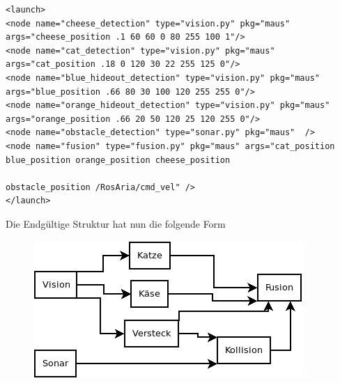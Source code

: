 \documentclass[11pt,a4paper]{article}
\begin{document}
\begin{tiny}
\begin{linenumbers}
\begin{lstlisting}
<launch>
<node name="cheese_detection" type="vision.py" pkg="maus" args="cheese_position .1 60 60 0 80 255 100 1"/>
<node name="cat_detection" type="vision.py" pkg="maus" args="cat_position .18 0 120 30 22 255 125 0"/>
<node name="blue_hideout_detection" type="vision.py" pkg="maus" args="blue_position .66 80 30 100 120 255 255 0"/>
<node name="orange_hideout_detection" type="vision.py" pkg="maus" args="orange_position .66 20 50 120 25 120 255 0"/>
<node name="obstacle_detection" type="sonar.py" pkg="maus"  />
<node name="fusion" type="fusion.py" pkg="maus" args="cat_position blue_position orange_position cheese_position 
                                                      obstacle_position /RosAria/cmd_vel" /> 
</launch>

\end{lstlisting}

\end{linenumbers}
\end{tiny}
Die Endgültige Struktur hat nun die folgende Form
\begin{figure}[H]
\centering
\includegraphics[scale=0.7]{media/struktur.png}
\end{figure}
\newpage


\end{document}
